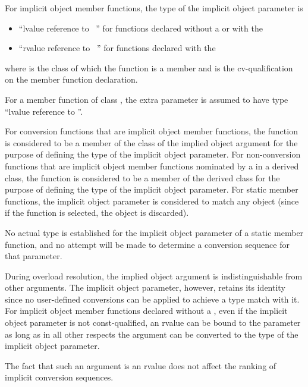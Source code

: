 \pnum
For implicit object member functions, the type of the implicit object
parameter is
\begin{itemize}
\item ``lvalue reference to \cv{}~'' for functions declared
without a  or with the
\tcode{\&} 
\item ``rvalue reference to \cv{}~'' for functions declared with the
\tcode{\&\&} 
\end{itemize}
where
is the class of which the function is a member and
\cv{}
is the cv-qualification on the
member function declaration.
\begin{example}
For a
member
function of class
,
the extra parameter is assumed to have type
``lvalue reference to
''.
\end{example}
For conversion functions that are implicit object member functions,
the function is considered to be a member of the
class of the implied object argument for the purpose of defining the
type of the implicit object parameter.
For non-conversion functions that are implicit object member functions
nominated by a 
in a derived class, the function is
considered to be a member of the derived class for the purpose of defining
the type of the implicit object parameter.
For static member functions, the implicit object parameter is considered
to match any object (since if the function is selected, the object is
discarded).
\begin{note}
No actual type is established for the implicit object parameter
of a static member function, and no attempt will be made to determine a
conversion sequence for that parameter.
\end{note}

\pnum
{}%
During overload resolution, the implied object argument is
indistinguishable from other arguments.
The implicit object
parameter, however, retains its identity since
no user-defined conversions can be applied to achieve a type
match with it.
%
For implicit object member functions declared without a ,
even if the implicit object parameter is not const-qualified,
an rvalue can be bound to the parameter
as long as in all other respects the argument can be
converted to the type of the implicit object parameter.
\begin{note}
The fact that such an argument is an rvalue does not
affect the ranking of implicit conversion sequences.
\end{note}

